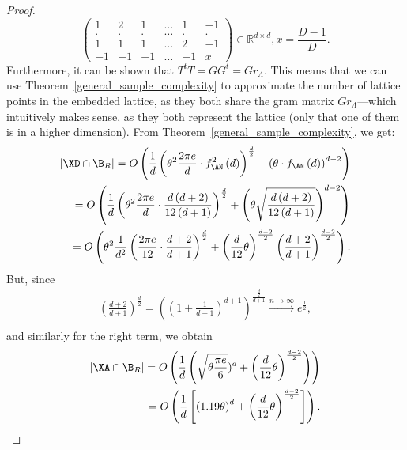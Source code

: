 \begin{proof}
\[\begin{pmatrix}
            1 & 2  &  1 & \dots & 1 & -1 \\
            . & .  &  . & \dots & . & .  \\
            1 & 1  &  1 & \dots & 2 & -1 \\
            -1 & -1 & -1 & \dots & -1 & x
        \end{pmatrix}\in\mathbb{R}^{d\times d}, x=\frac{D-1}{D}.
    \]
    Furthermore, it can be shown that $T^tT=GG^t=Gr_\Lambda$. This means that we can use Theorem~\ref{general_sample_complexity} to approximate the number of lattice points in the embedded lattice, as they both share the gram matrix $Gr_\Lambda$---which intuitively makes sense, as they both represent the lattice (only that one of them is in a higher dimension).
    From Theorem~\ref{general_sample_complexity}, we get:
    \begin{align*}
        |\XD\cap \B_R| = O\left(\frac{1}{d}\left(\theta^2\frac{2\pi e}{d}\cdot f_{\AN}^2\left(d\right)\right)^{\frac{d}{2}} + \left(\theta\cdot f_{\AN}\left(d\right)\right)^{d-2}\right) \\
        = O\left(\frac{1}{d}\left(\theta^2\frac{2\pi e}{d}\cdot \frac{d\left(d+2\right)}{12\left(d+1\right)}\right)^{\frac{d}{2}}+\left(\theta\sqrt{\frac{d\left(d+2\right)}{12\left(d+1\right)}}\right)^{d-2}\right)\\
        =O\left(\theta^2\frac{1}{d^2}\left(\frac{2\pi e}{12}\cdot \frac{d+2}{d+1}\right)^{\frac{d}{2}}+\left(\frac{d}{12}\theta\right)^{\frac{d-2}{2}}\left(\frac{d+2}{d+1}\right)^{\frac{d-2}{2}}\right).
    \end{align*}
    But, since
    \begin{align*}
        \left(\frac{d+2}{d+1}\right)^\frac{d}{2}=\left(\left(1+\frac{1}{d+1}\right)^{d+1}\right)^\frac{\frac{d}{2}}{d+1}\overset{n\rightarrow\infty}{\longrightarrow} e^{\frac{1}{2}},\\
    \end{align*}
    and similarly for the right term, we obtain
    \begin{align*}
         |\XA\cap \B_R| =O\left(\frac{1}{d}\left(\sqrt{\theta\frac{\pi e}{6}})^d+\left(\frac{d}{12}\theta\right)^{\frac{d-2}{2}}\right)\right)\\
         = O\left(\frac{1}{d}\left[\left(1.19\theta\right)^d+\left(\frac{d}{12}\theta\right)^\frac{d-2}{2}\right]\right).
    \end{align*}
\end{proof}

